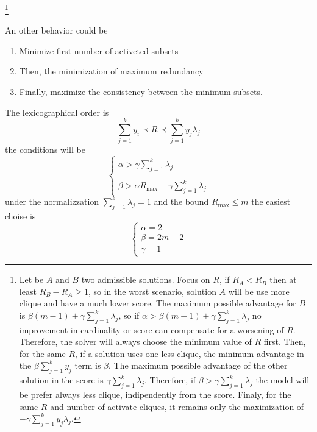 \documentclass[10pt]{article} %
\begin{document}
\footnote{Let be $A$ and $B$ two admissible solutions. Focus on $R$, if $R_{A} < R_{B}$ then at least $R_{B}-R_{A}\ge 1$, so in the worst scenario, solution $A$ will be use more clique and have a much lower score. The maximum possible advantage for $B$ is $\beta(m-1) +\gamma\sum_{j=1}^{k} \lambda_{j}$, so if $\alpha > \beta(m-1) +\gamma\sum_{j=1}^{k} \lambda_{j}$ no improvement in cardinality or score can compensate for a worsening of $R$. Therefore, the solver will always choose the minimum value of $R$ first. Then, for the same $R$, if a solution uses one less clique, the minimum advantage in the $\beta\sum_{j=1}^{k}y_{j}$ term is $\beta$. The maximum possible advantage of the other solution in the score is $\gamma\sum_{j=1}^{k}\lambda_{j}$. Therefore, if $\beta > \gamma\sum_{j=1}^{k}\lambda_{j}$ the model will be prefer always less clique, indipendently from the score. Finaly, for the same $R$ and number of activate cliques, it remains only the maximization of $-\gamma\sum_{j=1}^{k}y_{j}\lambda_{j}$.}

An other behavior could be
\begin{enumerate}
    \item Minimize first number of activeted subsets
    \item Then, the minimization of maximum redundancy
    \item Finally, maximize the consistency between the minimum subsets.
\end{enumerate}
The lexicographical order is
\begin{equation}
    \sum_{j=1}^{k} y_{i} \prec R \prec \sum_{j=1}^{k} y_{j}\lambda_{j}
\end{equation}
the conditions will be
\begin{equation}
    \begin{cases}
    \alpha >  \gamma \sum_{j=1}^{k} \lambda_{j} \\\\
    \beta > \alpha R_{\text{max}} + \gamma \sum_{j=1}^{k}\lambda_{j}
\end{cases}
\end{equation}
under the normalizzation $\sum_{j=1}^{k}\lambda _{j} = 1$ and the bound $R_{\text{max}} \leq m$ the easiest choise is
\begin{equation}
    \begin{cases}
        \alpha = 2 \\
        \beta =2m+2 \\
        \gamma = 1
    \end{cases}
\end{equation}
\end{document}
